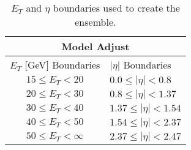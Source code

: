 \begin{comment}

\begin{table}[htb]
	\begin{center}
		{\small
			\begin{tabular}{cccc}
				\hline \hline
				\multicolumn{4}{c}{Model Adjust} \\ \hline \hline
				\multicolumn{4}{c}{$E_{T}$ {[}GeV{]} Boundaries} \\ \hline
				\multicolumn{4}{c}{$15 \leq E_T < 20 $}  \\
				\multicolumn{4}{c}{$20 \leq E_T < 30$}  \\
				\multicolumn{4}{c}{$30 \leq E_T < 40$} \\
				\multicolumn{4}{c}{$40 \leq E_T < 50$} \\
				\multicolumn{4}{c}{$50 \leq E_T < \infty$} \\\hline
				\multicolumn{4}{c}{$|\eta|$ Boundaries} \\ \hline
				\multicolumn{4}{c}{$0,0 \leq |\eta| < 0,8 $}  \\
				\multicolumn{4}{c}{$0,8 \leq |\eta| < 1,37$}  \\
				\multicolumn{4}{c}{$1,37 \leq |\eta| < 1,54$} \\
				\multicolumn{4}{c}{$1,54 \leq |\eta| < 2,37$} \\ 
				\multicolumn{4}{c}{$2,37 \leq |\eta| < 2,47$} \\ 
				\hline
				\hline
			\end{tabular}
		}
	\end{center}
	\caption{\label{tab:ensemble_regions} $E_T$ and $\eta$ boundaries used to create the ensemble.}
\end{table}

\end{comment}
\begin{table}[htb]
\begin{center}
	{\small
	\begin{tabular}{cccc}
		\hline \hline
		\multicolumn{4}{c}{Model Adjust}                                                                  \\ \hline
		\multicolumn{2}{c|}{$E_T$ {[}GeV{]} Boundaries} & \multicolumn{2}{l}{$|\eta|$ Boundaries}        \\ \hline
		\multicolumn{2}{c|}{$15 \leq E_T < 20 $}        & \multicolumn{2}{l}{$0.0 \leq |\eta| < 0.8 $}   \\
		\multicolumn{2}{c|}{$20 \leq E_T < 30 $}        & \multicolumn{2}{l}{$0.8 \leq |\eta| < 1.37 $}  \\
		\multicolumn{2}{c|}{$30 \leq E_T < 40 $}        & \multicolumn{2}{l}{$1.37 \leq |\eta| < 1.54 $} \\
		\multicolumn{2}{c|}{$40 \leq E_T < 50 $}        & \multicolumn{2}{l}{$1.54 \leq |\eta| < 2.37 $} \\
		\multicolumn{2}{c|}{$50 \leq E_T < \infty $}    & \multicolumn{2}{l}{$2.37 \leq |\eta| < 2.47 $}
	\end{tabular}
}
\end{center}
\caption{\label{tab:ensemble_regions} $E_T$ and $\eta$ boundaries used to create the ensemble.}
\end{table}